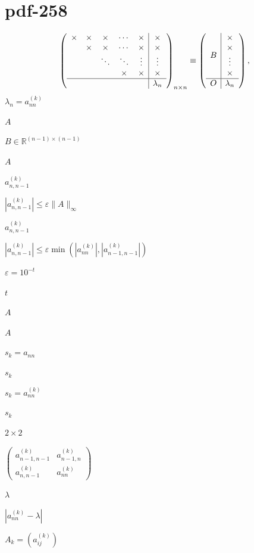 \documentclass[UTF8,fontset=fandol]{ctexart}
\begin{document}
\section*{pdf-258}
\[
\left(\begin{array}{ccccc|c}
\times&\times&\times&\cdots&\times&\times\\
&\times&\times&\cdots&\times&\times\\
&&\ddots&\ddots&\vdots&\vdots\\
&&&\times&\times&\times\\\hline
&&&&&\lambda_n
\end{array}\right)_{n\times n}
\equiv\left(\begin{array}{c|c}
B&\begin{matrix}\times\\\times\\\vdots\\\times\end{matrix}\\\hline
O&\lambda_n
\end{array}\right),
\]
$\lambda_n=a_{nn}^{(k)}$\par
$A$\par
$B\in\mathbb R^{(n-1)\times(n-1)}$\par
$A$\par
$a_{n,n-1}^{(k)}$\par
$|a_{n,n-1}^{(k)}|\leq\varepsilon\|A\|_\infty$\par
$a_{n,n-1}^{(k)}$\par
$|a_{n,n-1}^{(k)}|\leq\varepsilon\min(|a_{nn}^{(k)}|,|a_{n-1,n-1}^{(k)}|)$\par
$\varepsilon=10^{-t}$\par
$t$\par
$A$\par
$A$\par
$s_k=a_{nn}$\par
$s_k$\par
$s_k=a_{nn}^{(k)}$\par
$s_k$\par
$2\times2$\par
$\begin{pmatrix}a_{n-1,n-1}^{(k)}&a_{n-1,n}^{(k)}\\a_{n,n-1}^{(k)}&a_{nn}^{(k)}\end{pmatrix}$\par
$\lambda$\par
$|a_{nn}^{(k)}-\lambda|$\par
$A_k=(a_{ij}^{(k)})$\par
\end{document}
